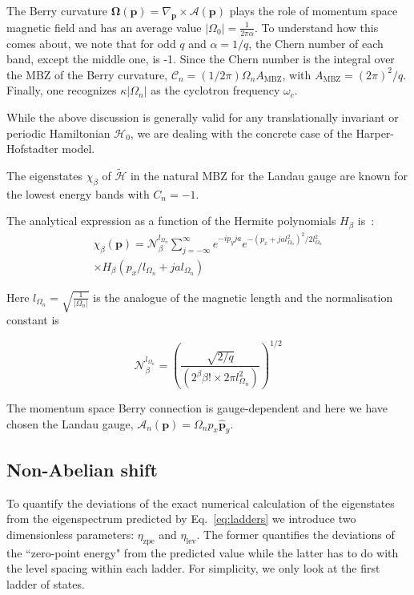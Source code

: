 \documentclass[twocolumn, 10pt, aps, superscriptaddress, floatfix, showpacs, pra, citeautoscript]{revtex4-1}
\newcommand{\vt}[1]{\mathbf{#1}}
\begin{document}
The Berry curvature
$\vt{\Omega}(\vt{p}) = \nabla_{\vt{p}} \times \mathcal{A}(\vt{p})$
plays the role of momentum space magnetic field and has an average
value $|\Omega_0| = \frac{1}{2\pi\alpha}$. To understand how this
comes about, we note that for odd $q$ and $\alpha = 1/q$, the Chern
number of each band, except the middle one, is -1. Since the Chern
number is the integral over the MBZ of the Berry curvature,
$\mathcal{C}_n = (1/2\pi) \Omega_n A_{\text{MBZ}}$, with
$A_{\text{MBZ}} = (2\pi)^2/q$.
%
Finally, one recognizes $\kappa |\Omega_n|$ as the cyclotron frequency
$\omega_c$.

While the above discussion is generally valid for any translationally
invariant or periodic Hamiltonian $\mathcal{H}_0$, we are dealing with
the concrete case of the Harper-Hofstadter model.

The eigenstates $\chi_\beta$ of $\widetilde{\mathcal{H}}$ in the
natural MBZ for the Landau gauge are known for the lowest energy bands
with $C_n = -1$.

The analytical expression as a function of the Hermite polynomials
$H_\beta$ is~\cite{price2014magnetic}:
%
\begin{multline}\label{eq:chi}
 \chi_\beta (\vt{p}) = \mathcal{N}_\beta^{l_{\Omega_n}} \sum_{j = -
 \infty}^{\infty} e^{- i p_y j a} e^{ - ( p_x + j a l_{\Omega_n}^2 )
 ^2 / 2 l_{\Omega_n}^2}\\
 \times H_\beta ( p_x / l_{\Omega_n} + j a
 l_{\Omega_n})
\end{multline}

Here $l_{\Omega_n} = \sqrt{\frac{1}{|\Omega_n|}}$ is the analogue of
the magnetic length and the normalisation constant is

\begin{equation}
\mathcal{N}_\beta^{l_{\Omega_n}} = \left( \frac{\sqrt{2/q}} {(2^\beta
\beta! \times 2 \pi l_{\Omega_n}^2)} \right)^{1/2}
\end{equation}

The momentum space Berry connection is gauge-dependent and here we
have chosen the Landau gauge,
$\mathcal{A}_n(\mathbf{p}) = \Omega_n p_x \hat{\vt{p}}_y$.


\subsection{Non-Abelian shift}\label{sec:non-abelian-shift}
To quantify the deviations of the exact numerical calculation of the
eigenstates from the eigenspectrum predicted by Eq.~\eqref{eq:ladders}
we introduce two dimensionless parameters: $\eta_{\text{zpe}}$ and
$\eta_{\text{lev}}$. The former quantifies the deviations of the
``zero-point energy" from the predicted value while the latter has to
do with the level spacing within each ladder. For simplicity, we only
look at the first ladder of states.
\end{document}
